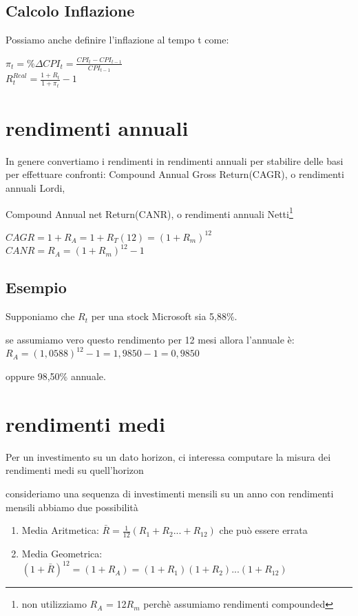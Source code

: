 \documentclass[a4paper,11pt]{report}
\begin{document}
{\subsection{Calcolo Inflazione}
	Possiamo anche definire l'inflazione al tempo t come:
\begin{center}
	$\pi_t = \%\Delta CPI_t = {\frac {CPI_t - CPI_{t-1}}{CPI_{t-1}}} $ \\
	$R_t^{Real}= {\frac {1+R_t}{1+ \pi_t}} - 1 $ 
\end{center} 
\newpage

\section{rendimenti annuali}
	In genere convertiamo i rendimenti in rendimenti annuali per stabilire delle basi per effettuare confronti:
	Compound Annual Gross Return(CAGR), o rendimenti annuali Lordi,

	Compound Annual net Return(CANR), o rendimenti annuali Netti\footnote{non utilizziamo $R_A$ = 12$R_m$ perchè assumiamo rendimenti compounded}
\begin{center}
	$CAGR = 1+R_A = 1+R_T(12) = (1+R_m)^{12} $ \\
	$CANR = R_A = (1+R_m)^12 - 1 $ \\
\end{center}
\subsection{Esempio}
	Supponiamo che $R_t$ per una stock Microsoft sia 5,88\%.

	se assumiamo vero questo rendimento per 12 mesi allora l'annuale è: \newline
	$R_A = (1,0588)^12 - 1 = 1,9850 - 1 = 0,9850 $ 

	oppure 98,50\% annuale.
\section{rendimenti medi}
	Per un investimento su un dato horizon, ci interessa computare la misura dei rendimenti medi su quell'horizon

	consideriamo una sequenza di investimenti mensili su un anno con rendimenti mensili abbiamo due possibilità
\begin{enumerate}
	\item Media Aritmetica: $ \bar{R} = {\frac {1}{12}}(R_1 + R_2 ... + R_12) $ che può essere errata
	\item Media Geometrica: $(1+ \bar{R})^{12} = (1+R_A) = (1+R_1)(1+R_2)...(1+R_{12}) $


\end{enumerate}}
\end{document}

